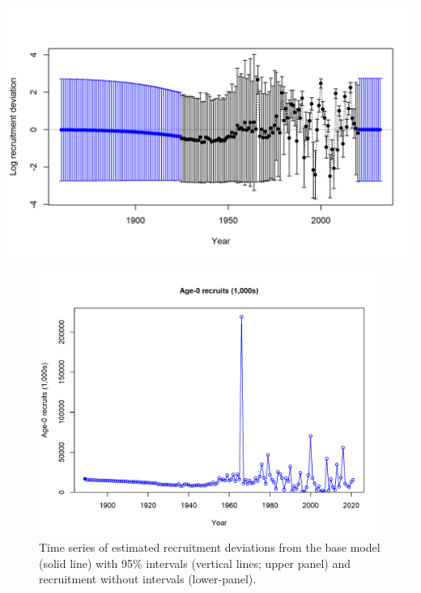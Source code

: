 \documentclass[11pt,
  english,
  a4paper,
]{article}
\begin{document}
\leavevmode\tagmcend\tagstructend\par


\includegraphics[width=1\textwidth,height=0.7\textheight]{figs/recdevs2_withbars.png} \newline

\tagmcend\tagstructend


\begin{figure}
\centering
\includegraphics[width=1\textwidth,height=0.7\textheight]{figs/ts11_Age-0_recruits_1000s.png}
\caption{Time series of estimated recruitment deviations from the base model (solid line) with 95\% intervals (vertical lines; upper panel) and recruitment without intervals (lower-panel).}
\end{figure}
\end{document}
